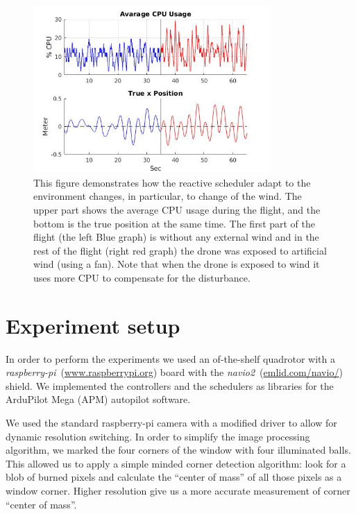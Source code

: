 \documentclass{sig-alternate-ipsn13}
\begin{document}
\begin{figure}[htbp]
    \centerline{\includegraphics[width=90mm]{windPlot15.jpg}}
    \caption{This figure demonstrates how the reactive scheduler adapt to the environment changes, in particular, to change of the wind. The upper part shows the average CPU usage during the flight, and the bottom is the true position at the same time. The first part of the flight (the left Blue graph) is without any external wind and in the rest of the flight (right red graph)  the drone was exposed to artificial wind (using a fan). Note that when the drone is exposed to wind it uses more CPU to compensate for the disturbance.}
    \label{fig:windPlot}
\end{figure}


\section{Experiment setup}
\label{sec:Experiment setup}

In order to perform the experiments we used an of-the-shelf quadrotor with a \textit{raspberry-pi}~(\url{www.raspberrypi.org}) board with the \textit{navio2}~(\url{emlid.com/navio/}) shield. We implemented the controllers and the schedulers as libraries for the ArduPilot Mega (APM) autopilot software.

We used the standard raspberry-pi camera with a modified driver to allow for dynamic resolution switching. %
In order to simplify the image processing algorithm, we marked the four corners of the window with four illuminated balls. This allowed us to apply a simple minded corner detection algorithm: 
look for a blob of burned pixels and calculate the ``center of mass'' of all those pixels as a window corner. Higher resolution give us a more accurate measurement of corner ``center of mass''.
\end{document}
